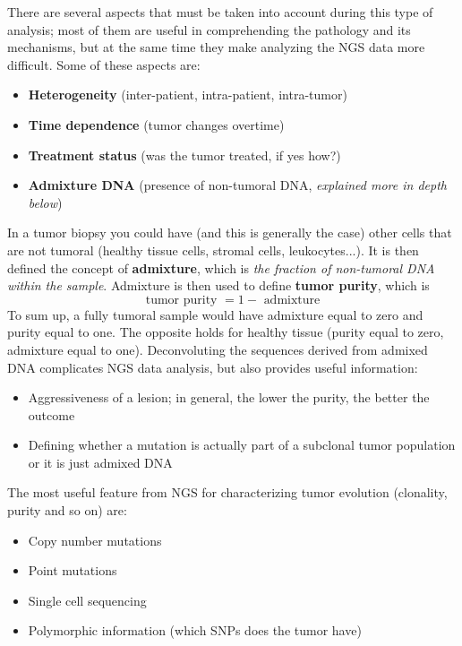  There are several aspects that must be taken into account during this type of analysis; most of them are useful in comprehending the pathology and its mechanisms, but at the same time they make analyzing the NGS data more difficult. Some of these aspects are:
  \begin{itemize}
    \item \textbf{Heterogeneity} (inter-patient, intra-patient, intra-tumor)
    \item \textbf{Time dependence} (tumor changes overtime)
    \item \textbf{Treatment status} (was the tumor treated, if yes how?)
    \item \textbf{Admixture DNA} (presence of non-tumoral DNA, \textit{explained more in depth below})
  \end{itemize}

  In a tumor biopsy you could have (and this is generally the case) other cells that are not tumoral (healthy tissue cells, stromal cells, leukocytes...). It is then defined the concept of \textbf{admixture}, which is \textit{the fraction of non-tumoral DNA within the sample}. Admixture is then used to define \textbf{tumor purity}, which is
  $$
  \text{tumor purity } = 1 - \text{ admixture}
  $$
  To sum up, a fully tumoral sample would have admixture equal to zero and purity equal to one. The opposite holds for healthy tissue (purity equal to zero, admixture equal to one).
  Deconvoluting the sequences derived from admixed DNA complicates NGS data analysis, but also provides useful information:
  \begin{itemize}
    \item Aggressiveness of a lesion; in general, the lower the purity, the better the outcome
    \item Defining whether a mutation is actually part of a subclonal tumor population or it is just admixed DNA
  \end{itemize}
  
  The most useful feature from NGS for characterizing tumor evolution (clonality, purity and so on) are:
  \begin{itemize}
    \item Copy number mutations
    \item Point mutations
    \item Single cell sequencing
    \item Polymorphic information (which SNPs does the tumor have)
  \end{itemize}

